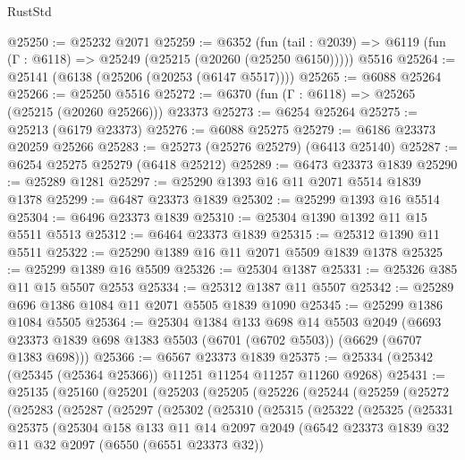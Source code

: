 \begin{lexlean}{RustStd}
\begin{coremodule}
@25250 := @25232 @2071
@25259 := @6352
    (fun (tail : @2039) => @6119 (fun (Γ : @6118) => @25249 (@25215 (@20260 (@25250 @6150)))))
    @5516
@25264 := @25141 (@6138 (@25206 (@20253 (@6147 @5517))))
@25265 := @6088 @25264
@25266 := @25250 @5516
@25272 := @6370 (fun (Γ : @6118) => @25265 (@25215 (@20260 @25266))) @23373
@25273 := @6254 @25264
@25275 := @25213 (@6179 @23373)
@25276 := @6088 @25275
@25279 := @6186 @23373 @20259 @25266
@25283 := @25273 (@25276 @25279) (@6413 @25140)
@25287 := @6254 @25275 @25279 (@6418 @25212)
@25289 := @6473 @23373 @1839
@25290 := @25289 @1281
@25297 := @25290 @1393 @16 @11 @2071 @5514 @1839 @1378
@25299 := @6487 @23373 @1839
@25302 := @25299 @1393 @16 @5514
@25304 := @6496 @23373 @1839
@25310 := @25304 @1390 @1392 @11 @15 @5511 @5513
@25312 := @6464 @23373 @1839
@25315 := @25312 @1390 @11 @5511
@25322 := @25290 @1389 @16 @11 @2071 @5509 @1839 @1378
@25325 := @25299 @1389 @16 @5509
@25326 := @25304 @1387
@25331 := @25326 @385 @11 @15 @5507 @2553
@25334 := @25312 @1387 @11 @5507
@25342 := @25289 @696 @1386 @1084 @11 @2071 @5505 @1839 @1090
@25345 := @25299 @1386 @1084 @5505
@25364 := @25304
    @1384
    @133
    @698
    @14
    @5503
    @2049
    (@6693 @23373 @1839 @698 @1383 @5503 (@6701 (@6702 @5503)) (@6629 (@6707 @1383 @698)))
@25366 := @6567 @23373 @1839
@25375 := @25334 (@25342 (@25345 (@25364 @25366)) @11251 @11254 @11257 @11260 @9268)
@25431 := @25135
    (@25160
      (@25201
        (@25203
          (@25205
            (@25226
              (@25244
                (@25259
                  (@25272
                    (@25283
                      (@25287
                        (@25297
                          (@25302
                            (@25310
                              (@25315
                                (@25322
                                  (@25325
                                    (@25331
                                      @25375
                                      (@25304
                                        @158
                                        @133
                                        @11
                                        @14
                                        @2097
                                        @2049
                                        (@6542
                                          @23373
                                          @1839
                                          @32
                                          @11
                                          @32
                                          @2097
                                          (@6550 (@6551 @23373 @32))

\end{coremodule}
\end{lexlean}

